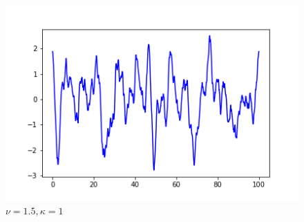 \documentclass{article}
\begin{document}
\begin{figure}[H]
  \begin{minipage}[t]{0.3\textwidth}
    \centering
    \includegraphics[width=\textwidth]{./pics/1D_RF_4096_100.0_1.5_1.png}  %
    \caption*{$\nu = 1.5, \kappa = 1$}
  \end{minipage}


\end{figure}
\end{document}
